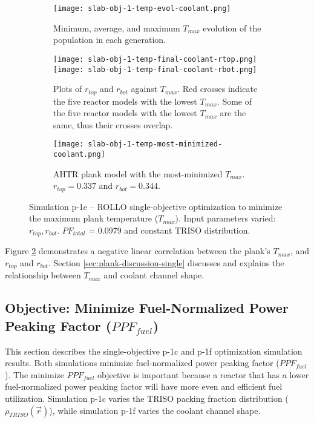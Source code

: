 \begin{figure}[htbp!]
    \centering
    \begin{subfigure}{\textwidth}
        \texttt{[image: slab-obj-1-temp-evol-coolant.png]}
        \caption{Minimum, average, and maximum $T_{max}$ evolution of the 
        population in each generation.}
        \label{fig:slab-obj-1-temp-evol-coolant} 
    \end{subfigure}
    \begin{subfigure}{\textwidth}
        \texttt{[image: slab-obj-1-temp-final-coolant-rtop.png]}
        \texttt{[image: slab-obj-1-temp-final-coolant-rbot.png]}
        \caption{Plots of $r_{top}$ and $r_{bot}$ against $T_{max}$. 
        Red crosses indicate the five reactor models with the 
        lowest $T_{max}$.
        Some of the five reactor models with the lowest $T_{max}$ are the same, thus 
        their crosses overlap.}
        \label{fig:slab-obj-1-temp-final-coolant} 
    \end{subfigure}
    \begin{subfigure}{\textwidth}
        \texttt{[image: slab-obj-1-temp-most-minimized-coolant.png]}
        \caption{\gls{AHTR} plank model with the most-minimized $T_{max}$. 
        $r_{top} = 0.337$ and $r_{bot} = 0.344$.}
        \label{fig:slab-obj-1-temp-most-minimized-coolant} 
    \end{subfigure}
    \caption{Simulation p-1e -- ROLLO single-objective optimization to minimize 
    the maximum plank temperature ($T_{max}$). 
    Input parameters varied: $r_{top}, r_{bot}$. $PF_{total}$ = 0.0979 and constant 
    TRISO distribution.}
    \label{fig:slab-obj-1-temp-coolant}
\end{figure}
Figure \ref{fig:slab-obj-1-temp-final-coolant} demonstrates a negative 
linear correlation between the plank's $T_{max}$, and $r_{top}$ and $r_{bot}$.
Section \ref{sec:plank-discussion-single} discusses and explains the relationship 
between $T_{max}$ and coolant channel shape. 

\subsection{Objective: Minimize Fuel-Normalized Power Peaking Factor ($PPF_{fuel}$)}
\label{sec:plank-1-obj-ppf}
This section describes the single-objective p-1c and p-1f optimization simulation
results. 
Both simulations minimize fuel-normalized power peaking factor ($PPF_{fuel}$). 
The minimize $PPF_{fuel}$ objective is important because a reactor that has a lower 
fuel-normalized power peaking factor will have more even and efficient fuel utilization. 
Simulation p-1c varies the \gls{TRISO} packing fraction distribution 
($\rho_{TRISO}(\vec{r})$), while simulation p-1f varies the coolant channel shape. 

